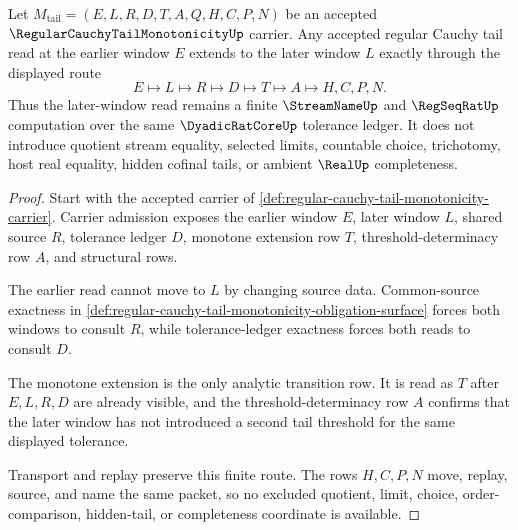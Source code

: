 \begin{theorem}
\label{thm:regular-cauchy-tail-monotonicity-window-extension}
Let $M_{\mathrm{tail}}=(E,L,R,D,T,A,Q,H,C,P,N)$ be an accepted $\RegularCauchyTailMonotonicityUp$ carrier. Any accepted regular Cauchy tail read at the earlier window $E$ extends to the later window $L$ exactly through the displayed route
$$
E \longmapsto L \longmapsto R \longmapsto D \longmapsto T \longmapsto A \longmapsto H,C,P,N .
$$
Thus the later-window read remains a finite $\StreamNameUp$ and $\RegSeqRatUp$ computation over the same $\DyadicRatCoreUp$ tolerance ledger. It does not introduce quotient stream equality, selected limits, countable choice, trichotomy, host real equality, hidden cofinal tails, or ambient $\RealUp$ completeness.
\end{theorem}
\begin{proof}
Start with the accepted carrier of \autoref{def:regular-cauchy-tail-monotonicity-carrier}. Carrier admission exposes the earlier window $E$, later window $L$, shared source $R$, tolerance ledger $D$, monotone extension row $T$, threshold-determinacy row $A$, and structural rows.

The earlier read cannot move to $L$ by changing source data. Common-source exactness in \autoref{def:regular-cauchy-tail-monotonicity-obligation-surface} forces both windows to consult $R$, while tolerance-ledger exactness forces both reads to consult $D$.

The monotone extension is the only analytic transition row. It is read as $T$ after $E,L,R,D$ are already visible, and the threshold-determinacy row $A$ confirms that the later window has not introduced a second tail threshold for the same displayed tolerance.

Transport and replay preserve this finite route. The rows $H,C,P,N$ move, replay, source, and name the same packet, so no excluded quotient, limit, choice, order-comparison, hidden-tail, or completeness coordinate is available.
\end{proof}


